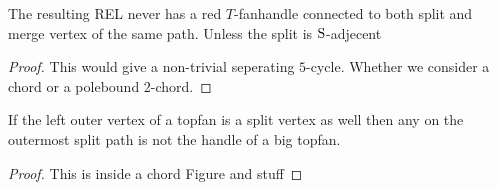       \begin{lemma}
        \label{lm:uni:noTfan above whole path}
        The resulting REL never has a red $T$-fanhandle connected to both split and merge vertex of the same path. Unless the split is $\mathrm{S}$-adjecent
      \end{lemma}
      \begin{proof}
          This would give a non-trivial seperating $5$-cycle. Whether we consider a chord or a polebound 2-chord.
      \end{proof}

      \begin{lemma}
        \label{lm:sweep:NoTwoSplitsAboveEachOther}
        If the left outer vertex of a topfan is a split vertex as well then any on the outermost split path is not the handle of a big topfan.
      \end{lemma}

      \begin{proof}
        This is inside a chord Figure and stuff
      \end{proof}
